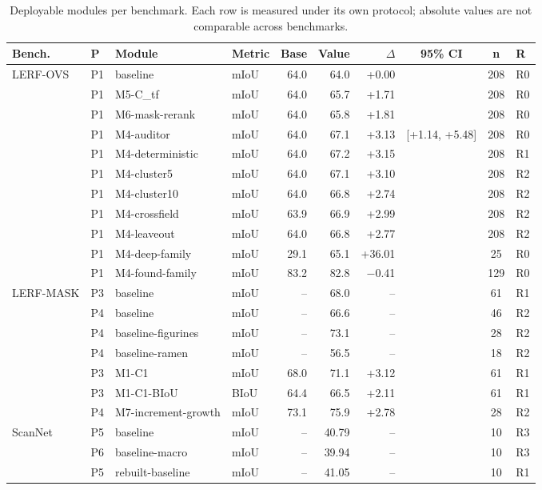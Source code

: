 \begin{table}[t]
\centering
\small
\caption{Deployable modules per benchmark. Each row is measured under its own protocol; absolute values are not comparable across benchmarks.}
\label{tab:main}
\begin{tabular}{llllrrrccl}
\toprule
Bench. & P & Module & Metric & Base & Value & $\Delta$ & 95\% CI & n & R \\
\midrule
LERF-OVS & P1 & baseline & mIoU & 64.0 & 64.0 & +0.00 &  & 208 & R0 \\
 & P1 & M5-C\_tf & mIoU & 64.0 & 65.7 & +1.71 &  & 208 & R0 \\
 & P1 & M6-mask-rerank & mIoU & 64.0 & 65.8 & +1.81 &  & 208 & R0 \\
 & P1 & M4-auditor & mIoU & 64.0 & 67.1 & +3.13 & [+1.14, +5.48] & 208 & R0 \\
 & P1 & M4-deterministic & mIoU & 64.0 & 67.2 & +3.15 &  & 208 & R1 \\
 & P1 & M4-cluster5 & mIoU & 64.0 & 67.1 & +3.10 &  & 208 & R2 \\
 & P1 & M4-cluster10 & mIoU & 64.0 & 66.8 & +2.74 &  & 208 & R2 \\
 & P1 & M4-crossfield & mIoU & 63.9 & 66.9 & +2.99 &  & 208 & R2 \\
 & P1 & M4-leaveout & mIoU & 64.0 & 66.8 & +2.77 &  & 208 & R2 \\
 & P1 & M4-deep-family & mIoU & 29.1 & 65.1 & +36.01 &  & 25 & R0 \\
 & P1 & M4-found-family & mIoU & 83.2 & 82.8 & $-$0.41 &  & 129 & R0 \\
LERF-MASK & P3 & baseline & mIoU & -- & 68.0 & -- &  & 61 & R1 \\
 & P4 & baseline & mIoU & -- & 66.6 & -- &  & 46 & R2 \\
 & P4 & baseline-figurines & mIoU & -- & 73.1 & -- &  & 28 & R2 \\
 & P4 & baseline-ramen & mIoU & -- & 56.5 & -- &  & 18 & R2 \\
 & P3 & M1-C1 & mIoU & 68.0 & 71.1 & +3.12 &  & 61 & R1 \\
 & P3 & M1-C1-BIoU & BIoU & 64.4 & 66.5 & +2.11 &  & 61 & R1 \\
 & P4 & M7-increment-growth & mIoU & 73.1 & 75.9 & +2.78 &  & 28 & R2 \\
ScanNet & P5 & baseline & mIoU & -- & 40.79 & -- &  & 10 & R3 \\
 & P6 & baseline-macro & mIoU & -- & 39.94 & -- &  & 10 & R3 \\
 & P5 & rebuilt-baseline & mIoU & -- & 41.05 & -- &  & 10 & R1 \\

\end{tabular}
\end{table}

